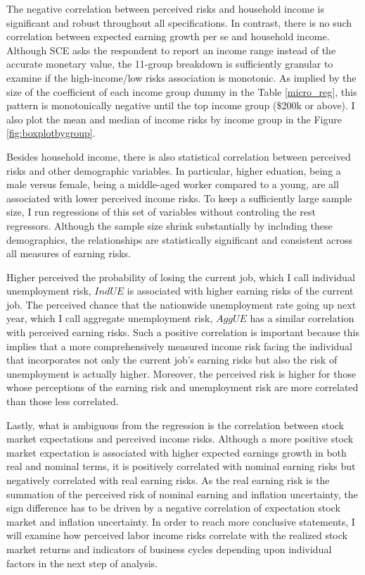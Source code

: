\documentclass[12pt,notitlepage,onecolumn,aps,pra]{article}
\begin{document}
The negative correlation between perceived risks and household income is
significant and robust throughout all specifications. In contrast, there
is no such correlation between expected earning growth per se and
household income. Although SCE asks the respondent to report an income
range instead of the accurate monetary value, the 11-group breakdown is
sufficiently granular to examine if the high-income/low risks
association is monotonic. As implied by the size of the coefficient of
each income group dummy in the Table \ref{micro_reg}, this pattern is
monotonically negative until the top income group (\$200k or above). I
also plot the mean and median of income risks by income group in the
Figure \ref{fig:boxplotbygroup}.

Besides household income, there is also statistical correlation between
perceived risks and other demographic variables. In particular, higher
eduation, being a male versus female, being a middle-aged worker
compared to a young, are all associated with lower perceived income
risks. To keep a sufficiently large sample size, I run regressions of
this set of variables without controling the rest regressors. Although
the sample size shrink substantially by including these demographics,
the relationships are statistically significant and consistent across
all measures of earning risks.

Higher perceived the probability of losing the current job, which I call
individual unemployment risk, \(\textit{IndUE}\) is associated with
higher earning risks of the current job. The perceived chance that the
nationwide unemployment rate going up next year, which I call aggregate
unemployment risk, \(\textit{AggUE}\) has a similar correlation with
perceived earning risks. Such a positive correlation is important
because this implies that a more comprehensively measured income risk
facing the individual that incorporates not only the current job's
earning risks but also the risk of unemployment is actually higher.
Moreover, the perceived risk is higher for those whose perceptions of
the earning risk and unemployment risk are more correlated than those
less correlated.

Lastly, what is ambiguous from the regression is the correlation between
stock market expectations and perceived income risks. Although a more
positive stock market expectation is associated with higher expected
earnings growth in both real and nominal terms, it is positively
correlated with nominal earning risks but negatively correlated with
real earning risks. As the real earning risk is the summation of the
perceived risk of nominal earning and inflation uncertainty, the sign
difference has to be driven by a negative correlation of expectation
stock market and inflation uncertainty. In order to reach more
conclusive statements, I will examine how perceived labor income risks
correlate with the realized stock market returns and indicators of
business cycles depending upon individual factors in the next step of
analysis.
\end{document}
